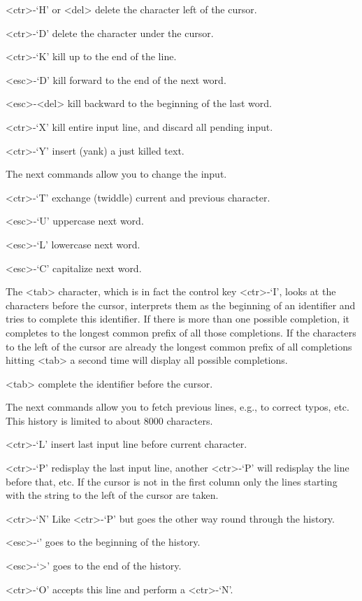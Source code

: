 <ctr>-`H' or <del> delete the character left of the cursor. 

<ctr>-`D' delete the character under the cursor. 

<ctr>-`K' kill up to the end of the line. 

<esc>-`D' kill forward to the end of the next word. 

<esc>-<del> kill backward to the beginning of the last word. 

<ctr>-`X' kill entire input line, and discard all pending input. 

<ctr>-`Y' insert (yank) a just killed text.

The next commands allow you to change the input.

<ctr>-`T' exchange (twiddle) current and previous character. 

<esc>-`U' uppercase next word. 

<esc>-`L' lowercase next word. 

<esc>-`C' capitalize next word.

The <tab> character, which is in fact the control key <ctr>-`I', looks at
the characters before the cursor, interprets them as the beginning of an
identifier and tries to complete this identifier. If there is more than
one possible completion, it completes to the longest common prefix of all
those completions. If the characters to the left of the cursor are
already the longest common prefix of all completions hitting <tab> a
second time will display all possible completions.

<tab>  complete the identifier before the cursor.

The next commands allow you to fetch previous lines, e.g., to correct
typos, etc. This history is limited to about 8000 characters.

<ctr>-`L' insert last input line before current character.

<ctr>-`P' redisplay the last input line, another <ctr>-`P' will
  redisplay the line before that, etc. If the cursor is
  not in the first column only the lines starting with the
  string to the left of the cursor are taken.

<ctr>-`N' Like <ctr>-`P' but goes the other way round through the
  history.

<esc>-`\<' goes to the beginning of the history.

<esc>-`>' goes to the end of the history.

<ctr>-`O' accepts this line and perform a <ctr>-`N'.

